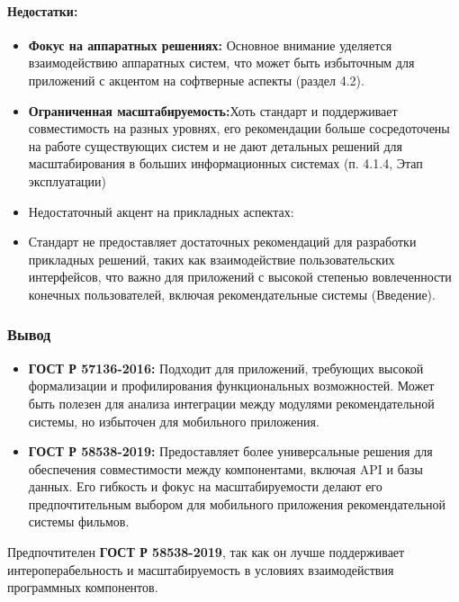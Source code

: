 \paragraph{Недостатки:}
\begin{itemize}
    \item \textbf{Фокус на аппаратных решениях:} Основное внимание уделяется взаимодействию аппаратных систем, что
    может быть избыточным для приложений с акцентом на софтверные аспекты (раздел 4.2).
    \item \textbf{Ограниченная масштабируемость:}Хоть стандарт и поддерживает совместимость на разных уровнях,
    его рекомендации больше сосредоточены на работе существующих систем и не дают детальных решений для масштабирования
    в больших информационных системах (п. 4.1.4, Этап эксплуатации)
    \item Недостаточный акцент на прикладных аспектах:
    \item Стандарт не предоставляет достаточных рекомендаций для разработки прикладных решений, таких как взаимодействие
    пользовательских интерфейсов, что важно для приложений с высокой степенью вовлеченности конечных пользователей,
    включая рекомендательные системы (Введение).

\end{itemize}

\subsubsection*{Вывод}
\begin{itemize}
    \item \textbf{ГОСТ Р 57136-2016:} Подходит для приложений, требующих высокой формализации и профилирования
    функциональных возможностей.
    Может быть полезен для анализа интеграции между модулями рекомендательной системы, но избыточен для мобильного приложения.
    \item \textbf{ГОСТ Р 58538-2019:} Предоставляет более универсальные решения для обеспечения совместимости
    между компонентами, включая API и базы данных.
    Его гибкость и фокус на масштабируемости делают его предпочтительным
    выбором для мобильного приложения рекомендательной системы фильмов.
\end{itemize}

Предпочтителен \textbf{ГОСТ Р 58538-2019}, так как он лучше
поддерживает интероперабельность и масштабируемость в условиях взаимодействия программных компонентов.
